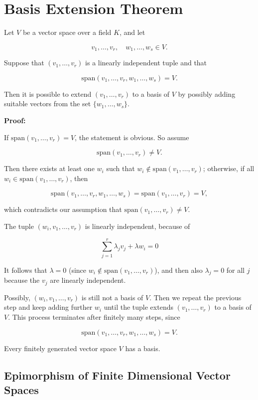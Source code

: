 \section{Basis Extension Theorem}

Let \(V\) be a vector space over a field \(K\), and let

\[
	v_1, \ldots, v_r,\quad w_1, \ldots, w_s \in V.
\]

Suppose that \((v_1, \ldots, v_r)\) is a linearly independent tuple and that

\[
	\mathrm{span}(v_1, \ldots, v_r, w_1, \ldots, w_s) = V.
\]

Then it is possible to extend \((v_1, \ldots, v_r)\) to a basis of \(V\) by possibly adding suitable
vectors from the set \(\{w_1, \ldots, w_s\}\).

\textbf{Proof:}

If \(\mathrm{span}(v_1, \ldots, v_r) = V\), the statement is obvious. So assume

\[
	\mathrm{span}(v_1, \ldots, v_r) \neq V.
\]

Then there exists at least one \(w_i\) such that \(w_i \notin \mathrm{span}(v_1, \ldots, v_r)\);
otherwise, if all \(w_i \in \mathrm{span}(v_1, \ldots, v_r)\), then

\[
	\mathrm{span}(v_1, \ldots, v_r, w_1, \ldots, w_s) = \mathrm{span}(v_1, \ldots, v_r) = V,
\]

which contradicts our assumption that \(\mathrm{span}(v_1, \ldots, v_r) \neq V\).

The tuple \((w_i, v_1, \ldots, v_r)\) is linearly independent, because of

\[
	\sum_{j=1}^r \lambda_j v_j + \lambda w_i = 0
\]

It follows that \(\lambda = 0\) (since \(w_i \notin \mathrm{span}(v_1, \ldots, v_r)\)), and then also
\(\lambda_j = 0\) for all \(j\) because the \(v_j\) are linearly independent.

Possibly, \((w_i, v_1, \ldots, v_r)\) is still not a basis of \(V\). Then we repeat the previous step and
keep adding further \(w_i\) until the tuple extends \((v_1, \ldots, v_r)\) to a basis of \(V\). This
process terminates after finitely many steps, since

\[
	\mathrm{span}(v_1, \ldots, v_r, w_1, \ldots, w_s) = V.
\]

\QED

Every finitely generated vector space \(V\) has a basis.

\subsection{Epimorphism of Finite Dimensional Vector Spaces}

